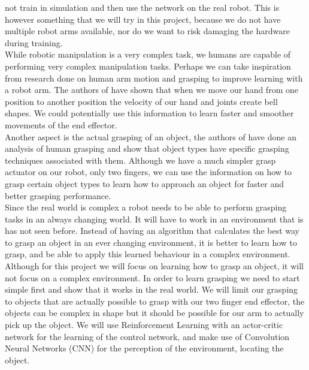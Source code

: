 not train in simulation and then use the network on the real robot. This is however something that we will try in this project, because we do not have multiple robot arms available, nor do we want to risk damaging the hardware during training. \\
While robotic manipulation is a very complex task, we humans are capable of performing very complex manipulation tasks. Perhaps we can take inspiration from research done on human arm motion and grasping to improve learning with a robot arm.
The authors of \cite{abend1982human} have shown that when we move our hand from one position to another position the velocity of our hand and joints create bell shapes. We could potentially use this information to learn 
faster and smoother movements of the end effector. \\
Another aspect is the actual grasping of an object, the authors of \cite{feix2014analysis} have done an analysis of human grasping and show that object types have specific grasping techniques associated with them. Although we have a 
much simpler grasp actuator on our robot, only two fingers, we can use the information on how to grasp certain object types to learn how to approach an object for faster and better grasping performance.  \\
Since the real world is complex a robot needs to be able to perform grasping tasks in an always changing world. It will have to work in an environment that is has not seen before. Instead of having an algorithm that calculates
the best way to grasp an object in an ever changing environment, it is better to learn how to grasp, and be able to apply this learned behaviour in a complex environment. Although for this project we will focus on learning 
how to grasp an object, it will not focus on a complex environment. In order to learn grasping we need to start simple first and show that it works in the real world. We will limit our grasping to objects that are actually possible 
to grasp with our two finger end effector, the objects can be complex in shape but it should be possible for our arm to actually pick up the object. We will use Reinforcement Learning with an actor-critic network for the learning 
of the control network, and make use of Convolution Neural Networks (CNN) \cite{cnn} for the perception of the environment, locating the object. 





